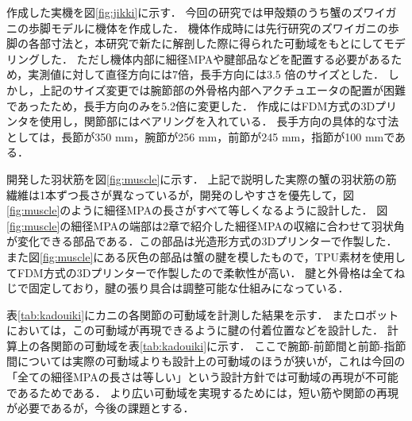 \documentclass{jarticle}
\begin{document}
作成した実機を図\ref{fig:jikki}に示す．
今回の研究では甲殻類のうち蟹のズワイガニの歩脚モデルに機体を作成した．
機体作成時には先行研究\cite{crabrobot2}のズワイガニの歩脚の各部寸法と，本研究で新たに解剖した際に得られた可動域をもとにしてモデリングした．
ただし機体内部に細径MPAや腱部品などを配置する必要があるため，実測値に対して直径方向には7倍，長手方向には3.5 倍のサイズとした．
しかし，上記のサイズ変更では腕節部の外骨格内部へアクチュエータの配置が困難であったため，長手方向のみを5.2倍に変更した．
作成にはFDM方式の3Dプリンタを使用し，関節部にはベアリングを入れている．
長手方向の具体的な寸法としては，長節が350 mm，腕節が256 mm，前節が245 mm，指節が100 mmである．

開発した羽状筋を図\ref{fig:muscle}に示す．
上記で説明した実際の蟹の羽状筋の筋繊維は1本ずつ長さが異なっているが，開発のしやすさを優先して，図\ref{fig:muscle}のように細径MPAの長さがすべて等しくなるように設計した．
図\ref{fig:muscle}の細径MPAの端部は2章で紹介した細径MPAの収縮に合わせて羽状角が変化できる部品である．この部品は光造形方式の3Dプリンターで作製した．
また図\ref{fig:muscle}にある灰色の部品は蟹の腱を模したもので，TPU素材を使用してFDM方式の3Dプリンターで作製したので柔軟性が高い．
腱と外骨格は全てねじで固定しており，腱の張り具合は調整可能な仕組みになっている．

表\ref{tab:kadouiki}にカニの各関節の可動域を計測した結果を示す．
またロボットにおいては，この可動域が再現できるように腱の付着位置などを設計した．
計算上の各関節の可動域を表\ref{tab:kadouiki}に示す．
ここで腕節-前節間と前節-指節間については実際の可動域よりも設計上の可動域のほうが狭いが，これは今回の「全ての細径MPAの長さは等しい」という設計方針では可動域の再現が不可能であるためである．
より広い可動域を実現するためには，短い筋や関節の再現が必要であるが，今後の課題とする．

\end{document}
